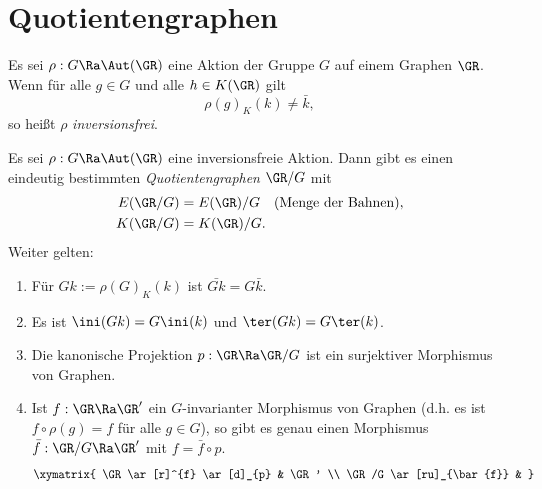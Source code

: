 \section{Quotientengraphen}\label{sec_qg}

\DEF Es sei $\rho:G\Ra\Aut(\GR)$ eine Aktion der Gruppe $G$ auf einem
Graphen $\GR$. Wenn für alle $g\in G$ und alle $h\in K(\GR)$ gilt
\[
\rho(g)_K(k) \neq \bar{k},
\]
so heißt $\rho$ \emph{inversionsfrei}.

\DB Es sei $\rho:G\Ra\Aut(\GR)$ eine inversionsfreie Aktion.
Dann gibt es einen eindeutig bestimmten
\emph{Quotientengraphen}
$\GR/G$ mit
\begin{align*}
E(\GR/G) &= E(\GR)/G \quad\text{(Menge der Bahnen)},\\
K(\GR/G) &= K(\GR)/G.
\end{align*}
Weiter gelten:
\begin{enumerate}
\item Für $Gk:=\rho(G)_K(k)$ ist $\bar{Gk}=G\bar{k}$.
\item Es ist $\ini(Gk)=G \ini(k)$ und $\ter(Gk)=G\ter(k)$.
\item Die kanonische Projektion
	$p:\GR\Ra\GR/G$ ist ein surjektiver Morphismus von Graphen.
\item Ist $f:\GR\Ra\GR'$ ein $G$-invarianter Morphismus von
Graphen (d.h. es ist $f\circ\rho(g)=f$ für alle $g\in G$),
so gibt es genau einen Morphismus
$\bar{f}:\GR/G\Ra \GR'$ mit $f=\bar{f}\circ p$.
\[\xymatrix{
\GR \ar[r]^{f} \ar[d]_{p} & \GR' \\
\GR/G \ar[ru]_{\bar{f}} &
}\]
\end{enumerate}

